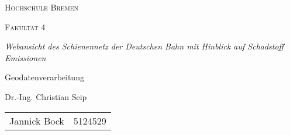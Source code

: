 \documentclass{article}
\begin{document}
\begin{titlepage}
        \begin{center}
                {\scshape\LARGE Hochschule Bremen \par}
                \vspace{1cm}
                {\scshape\Large Fakultät 4 \par}
                \vspace{1cm}
                {\Large\itshape Webansicht des Schienennetz der Deutschen Bahn mit Hinblick auf Schadstoff Emissionen\par}
                \vspace{1cm}
                {\rmfamily\large  Geodatenverarbeitung \par}
                {\rmfamily\large  Dr.-Ing. Christian Seip\par}
                \vspace{2cm}
                {\large
                        \begin{tabular}{ll}
                        Jannick Bock & 5124529\\
                \end{tabular}
                }
        \end{center}
        \vfill
\end{titlepage}

\pagebreak
\tableofcontents
\pagebreak

\pagebreak

\pagebreak

\pagebreak

\pagebreak

\pagebreak

\pagebreak
{}
\listoffigures
\pagebreak
\printbibliography
\end{document}
